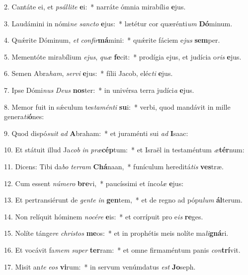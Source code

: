2. Cantáte ei, et \textit{psál}\textit{li}\textit{te} \textbf{e}i:~*  narráte ómnia mirabíli\textit{a} \textbf{e}jus.\

3. Laudámini in nómi\textit{ne} \textit{sanc}\textit{to} \textbf{e}jus:~*  lætétur cor quærénti\textit{um} \textbf{Dó}minum.\

4. Quǽrite Dóminum, \textit{et} \textit{con}\textit{fir}\textbf{má}mini:~*  quǽrite fáciem e\textit{jus} \textbf{sem}per.\

5. Mementóte mirabílium \textit{e}\textit{jus}, \textit{quæ} \textbf{fe}cit:~*  prodígia ejus, et judícia o\textit{ris} \textbf{e}jus.\

6. Semen Abra\textit{ham}, \textit{ser}\textit{vi} \textbf{e}jus:~*  fílii Jacob, eléc\textit{ti} \textbf{e}jus.\

7. Ipse Dómi\textit{nus} \textit{De}\textit{us} \textbf{nos}ter:~*  in univérsa terra judíci\textit{a} \textbf{e}jus.\

8. Memor fuit in sǽculum tes\textit{ta}\textit{mén}\textit{ti} \textbf{su}i:~*  verbi, quod mandávit in mille genera\textit{ti}\textbf{ó}nes:\

9. Quod dispó\textit{su}\textit{it} \textit{ad} \textbf{A}braham:~*  et juraménti sui \textit{ad} \textbf{I}saac:\

10. Et státuit illud Ja\textit{cob} \textit{in} \textit{præ}\textbf{cép}tum:~*  et Israël in testaméntum \textit{æ}\textbf{tér}num:\

11. Dicens: Tibi da\textit{bo} \textit{ter}\textit{ram} \textbf{Chá}naan,~*  funículum hereditá\textit{tis} \textbf{ves}træ.\

12. Cum essent \textit{nú}\textit{me}\textit{ro} \textbf{bre}vi,~*  paucíssimi et ínco\textit{læ} \textbf{e}jus:\

13. Et pertransiérunt de \textit{gen}\textit{te} \textit{in} \textbf{gen}tem,~*  et de regno ad pópu\textit{lum} \textbf{ál}terum.\

14. Non relíquit hóminem \textit{no}\textit{cé}\textit{re} \textbf{e}is:~*  et corrípuit pro e\textit{is} \textbf{re}ges.\

15. Nolíte tánge\textit{re} \textit{chris}\textit{tos} \textbf{me}os:~*  et in prophétis meis nolíte ma\textit{li}\textbf{gná}ri.\

16. Et vocávit fa\textit{mem} \textit{su}\textit{per} \textbf{ter}ram:~*  et omne firmaméntum panis \textit{con}\textbf{trí}vit.\

17. Misit an\textit{te} \textit{e}\textit{os} \textbf{vi}rum:~*  in servum venúmdatus \textit{est} \textbf{Jo}seph.\

